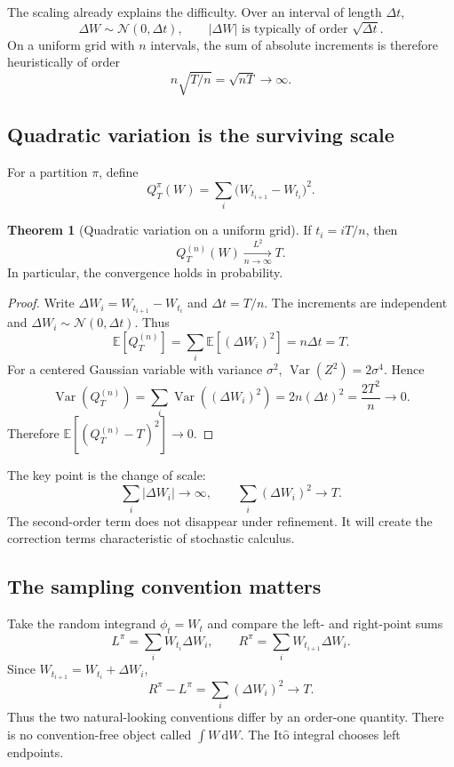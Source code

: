 \documentclass[10pt]{article}
\newcommand{\E}{\mathbb E}
\newcommand{\1}{\mathbf 1}
\newcommand{\dd}{\,\mathrm d}
\newcommand{\Ito}{\mathrm{It\hat{o}}}
\DeclareMathOperator{\Var}{Var}
\theoremstyle{definition}
\newtheorem{theorem}[definition]{Theorem}
\begin{document}
The scaling already explains the difficulty. Over an interval of length
\(\Delta t\),
\[
\Delta W\sim\mathcal N(0,\Delta t),
\qquad |\Delta W|\text{ is typically of order }\sqrt{\Delta t}.
\]
On a uniform grid with \(n\) intervals, the sum of absolute increments is
therefore heuristically of order
\[
n\sqrt{T/n}=\sqrt{nT}\longrightarrow\infty.
\]

\subsection{Quadratic variation is the surviving scale}

For a partition \(\pi\), define
\[
Q_T^\pi(W)=\sum_i\bigl(W_{t_{i+1}}-W_{t_i}\bigr)^2.
\]

\begin{theorem}[Quadratic variation on a uniform grid]
If \(t_i=iT/n\), then
\[
Q_T^{(n)}(W)\xrightarrow[n\to\infty]{L^2}T.
\]
In particular, the convergence holds in probability.
\end{theorem}

\begin{proof}
Write \(\Delta W_i=W_{t_{i+1}}-W_{t_i}\) and \(\Delta t=T/n\). The
increments are independent and \(\Delta W_i\sim\mathcal N(0,\Delta t)\).
Thus
\[
\E[Q_T^{(n)}]=\sum_i\E[(\Delta W_i)^2]=n\Delta t=T.
\]
For a centered Gaussian variable with variance \(\sigma^2\),
\(\Var(Z^2)=2\sigma^4\). Hence
\[
\Var(Q_T^{(n)})
=\sum_i\Var((\Delta W_i)^2)
=2n(\Delta t)^2
=\frac{2T^2}{n}\longrightarrow0.
\]
Therefore \(\E[(Q_T^{(n)}-T)^2]\to0\).
\end{proof}

The key point is the change of scale:
\[
\sum_i|\Delta W_i|\longrightarrow\infty,
\qquad
\sum_i(\Delta W_i)^2\longrightarrow T.
\]
The second-order term does not disappear under refinement. It will create the
correction terms characteristic of stochastic calculus.

\subsection{The sampling convention matters}

Take the random integrand \(\phi_t=W_t\) and compare the left- and right-point
sums
\[
L^\pi=\sum_iW_{t_i}\Delta W_i,
\qquad
R^\pi=\sum_iW_{t_{i+1}}\Delta W_i.
\]
Since \(W_{t_{i+1}}=W_{t_i}+\Delta W_i\),
\[
R^\pi-L^\pi=\sum_i(\Delta W_i)^2\longrightarrow T.
\]
Thus the two natural-looking conventions differ by an order-one quantity.
There is no convention-free object called \(\int W\dd W\). The \(\Ito\)
integral chooses left endpoints.
\end{document}
